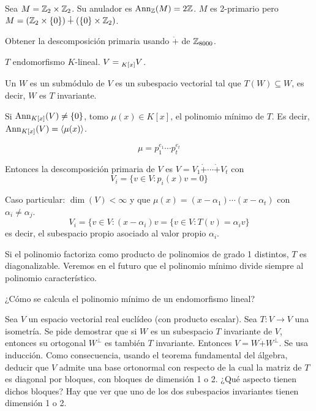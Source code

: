 \begin{ejemplo}
  Sea \(M = \mathbb{Z}_2 \times \mathbb{Z}_2\). Su anulador es \(\operatorname{Ann}_{\mathbb{Z}}(M) = 2\mathbb{Z}\). \(M\) es 2-primario
  pero \(M = (\mathbb{Z}_2 \times \{0\}) \dotplus (\{0\} \times \mathbb{Z}_2)\).
\end{ejemplo}

\begin{ejercicio}
  Obtener la descomposición primaria usando \(\dot{+}\) de \(\mathbb{Z}_{8000}\).
\end{ejercicio}

\begin{ejemplo}
  \(T\) endomorfismo \(K\)-lineal. \(V=\prescript{}{K[x]}{V}\).

  Un \(W\) es un submódulo de \(V\) es un subespacio vectorial tal que
  \(T(W)\subseteq W\), es decir, \(W\) es \(T\) invariante.

  Si \(\operatorname{Ann}_{K[x]}(V)\neq\{0\}\), tomo \(\mu(x)\in K[x]\), el polinomio
  mínimo de \(T\). Es decir, \(\operatorname{Ann}_{K[x]}(V)=\langle\mu(x)\rangle\).

  \[
    \mu=p_1^{e_1}\cdots p_t^{e_t}
  \]

  Entonces la descomposición primaria de \(V\) es \(V=V_1\dot{+}
  \cdots\dot{+}V_t\) con
  \[
    V_i=\{v\in V:p_i(x)v=0\}
  \]

  Caso particular: \(\dim(V)<\infty\) y que \(\mu(x)=(x-\alpha_1)\cdots
  (x-\alpha_t)\) con \(\alpha_i\neq\alpha_j\).
  \[
    V_i=\{v\in V:(x-\alpha_i)v=\{v\in V:T(v)=\alpha_i v\}
  \]
  es decir, el subespacio propio asociado al valor propio \(\alpha_i\).

  Si el polinomio factoriza como producto de polinomios de grado 1 distintos,
  \(T\) es diagonalizable.
  Veremos en el futuro que el polinomio mínimo divide siempre al polinomio
  característico.

  ¿Cómo se calcula el polinomio mínimo de un endomorfismo lineal?
\end{ejemplo}

\begin{ejercicio}
  Sea \(V\) un espacio vectorial real euclídeo (con producto
  escalar). Sea \(T:V\longrightarrow V\) una isometría.
  Se pide demostrar que si \(W\) es un subespacio \(T\) invariante de \(V\),
  entonces su ortogonal \(W^\perp\) es también \(T\) invariante.
  Entonces \(V=W\dot{+}W^\perp\). Se usa inducción. Como consecuencia, usando
  el teorema fundamental del álgebra, deducir que \(V\) admite una base
  ortonormal con respecto de la cual la matriz de \(T\) es diagonal por
  bloques, con bloques de dimensión 1 o 2. ¿Qué aspecto tienen dichos
  bloques? Hay que ver que uno de los dos subespacios invariantes tienen
  dimensión 1 o 2.
\end{ejercicio}

